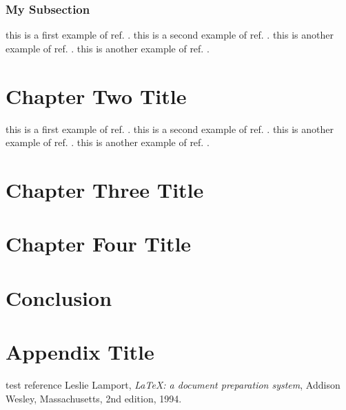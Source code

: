\documentclass[12pt]{report}
\begin{document}
\subsection{My Subsection}



this is a first example of ref. \cite{Testref98}.
this is a second example of ref. \cite{Testref98,lamport94}.
this is another example of ref. \cite{lamport94}.
this is another example of ref. \cite{lamport94}.


\chapter{Chapter Two Title}
%



this is a first example of ref. \cite{Testref98}.
this is a second example of ref. \cite{Testref98,lamport94}.
this is another example of ref. \cite{lamport94}.
this is another example of ref. \cite{lamport94}.

\chapter{Chapter Three Title}
%

\chapter{Chapter Four Title}
%

\chapter{Conclusion}
%

\appendix
\chapter{Appendix Title}
%



\begin{thebibliography}{99}
 test reference
  Leslie Lamport,
  \textit{\LaTeX: a document preparation system},
  Addison Wesley, Massachusetts,
  2nd edition,
  1994.
\end{thebibliography}
\end{document}
